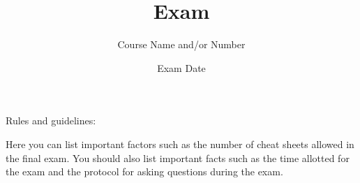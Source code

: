 \title{Exam}
\author{Course Name and/or Number}

\date{Exam Date}

\maketitle


\bigskip


\bigskip

Rules and guidelines:

\begin{compactitem}

  \item Here you can list important factors such as the number of cheat sheets
    allowed in the final exam. You should also list important facts such as the
    time allotted for the exam and the protocol for asking questions during the
    exam.

\end{compactitem}

\begin{center}

  \gradetable[h][questions]


\end{center}
